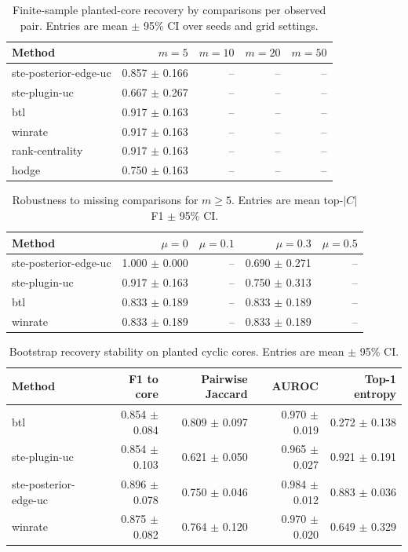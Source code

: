 \begin{table}[t]
\centering
\caption{Finite-sample planted-core recovery by comparisons per observed pair. Entries are mean $\pm$ 95\% CI over seeds and grid settings.}
\begin{tabular}{lrrrr}
\toprule
Method & $m=5$ & $m=10$ & $m=20$ & $m=50$ \\ 
\midrule
ste-posterior-edge-uc & 0.857 $\pm$ 0.166 & -- & -- & -- \\ 
ste-plugin-uc & 0.667 $\pm$ 0.267 & -- & -- & -- \\ 
btl & 0.917 $\pm$ 0.163 & -- & -- & -- \\ 
winrate & 0.917 $\pm$ 0.163 & -- & -- & -- \\ 
rank-centrality & 0.917 $\pm$ 0.163 & -- & -- & -- \\ 
hodge & 0.750 $\pm$ 0.163 & -- & -- & -- \\ 
\bottomrule
\end{tabular}
\end{table}

\begin{table}[t]
\centering
\caption{Robustness to missing comparisons for $m\ge5$. Entries are mean top-$|C|$ F1 $\pm$ 95\% CI.}
\begin{tabular}{lrrrr}
\toprule
Method & $\mu=0$ & $\mu=0.1$ & $\mu=0.3$ & $\mu=0.5$ \\ 
\midrule
ste-posterior-edge-uc & 1.000 $\pm$ 0.000 & -- & 0.690 $\pm$ 0.271 & -- \\ 
ste-plugin-uc & 0.917 $\pm$ 0.163 & -- & 0.750 $\pm$ 0.313 & -- \\ 
btl & 0.833 $\pm$ 0.189 & -- & 0.833 $\pm$ 0.189 & -- \\ 
winrate & 0.833 $\pm$ 0.189 & -- & 0.833 $\pm$ 0.189 & -- \\ 
\bottomrule
\end{tabular}
\end{table}

\begin{table}[t]
\centering
\caption{Bootstrap recovery stability on planted cyclic cores. Entries are mean $\pm$ 95\% CI.}
\begin{tabular}{lrrrr}
\toprule
Method & F1 to core & Pairwise Jaccard & AUROC & Top-1 entropy \\ 
\midrule
btl & 0.854 $\pm$ 0.084 & 0.809 $\pm$ 0.097 & 0.970 $\pm$ 0.019 & 0.272 $\pm$ 0.138 \\ 
ste-plugin-uc & 0.854 $\pm$ 0.103 & 0.621 $\pm$ 0.050 & 0.965 $\pm$ 0.027 & 0.921 $\pm$ 0.191 \\ 
ste-posterior-edge-uc & 0.896 $\pm$ 0.078 & 0.750 $\pm$ 0.046 & 0.984 $\pm$ 0.012 & 0.883 $\pm$ 0.036 \\ 
winrate & 0.875 $\pm$ 0.082 & 0.764 $\pm$ 0.120 & 0.970 $\pm$ 0.020 & 0.649 $\pm$ 0.329 \\ 
\bottomrule
\end{tabular}
\end{table}

